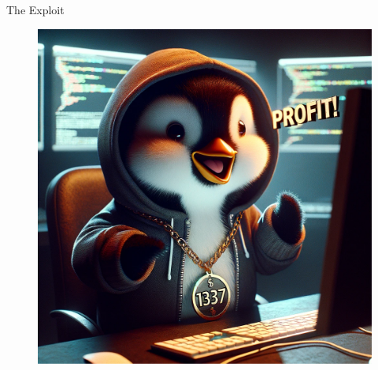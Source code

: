 \documentclass[usenames,dvipsnames]{beamer}
\begin{document}
\begin{frame}{The Exploit}
{\begin{figure}
                \includegraphics[scale=0.22]{profit_penguin}
            \end{figure}
        }
    \end{frame}
\end{document}

